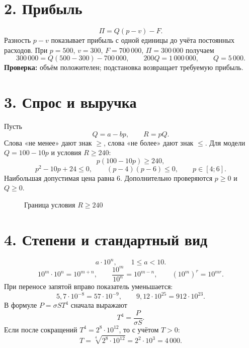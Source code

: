 \documentclass[a4paper,12pt]{article}
\newcommand{\term}[1]{\textbf{\textcolor{darkaccent}{#1}}}
\begin{document}
\section*{2. Прибыль}
\[
\Pi=Q(p-v)-F.
\]
Разность $p-v$ показывает прибыль с одной единицы до учёта постоянных расходов.
При $p=500$, $v=300$, $F=700\,000$, $\Pi=300\,000$ получаем
\[
300\,000=Q(500-300)-700\,000,
\qquad 200Q=1\,000\,000,
\qquad Q=5\,000.
\]
\term{Проверка:} объём положителен; подстановка возвращает требуемую прибыль.
\section*{3. Спрос и выручка}
Пусть
\[
Q=a-bp,\qquad R=pQ.
\]
Слова «не менее» дают знак $\ge$, слова «не более» дают знак $\le$.
Для модели $Q=100-10p$ и условия $R\ge240$:
\[
p(100-10p)\ge240,
\]
\[
p^2-10p+24\le0,
\qquad (p-4)(p-6)\le0,
\qquad p\in[4;6].
\]
Наибольшая допустимая цена равна $6$. Дополнительно проверяются $p\ge0$ и $Q\ge0$.
\begin{figure}[ht]\centering
{}
\caption{Граница условия $R\ge240$}
\end{figure}
\section*{4. Степени и стандартный вид}
\[
a\cdot10^n,\qquad 1\le a<10.
\]
\[
10^m\cdot10^n=10^{m+n},\qquad \frac{10^m}{10^n}=10^{m-n},\qquad (10^m)^r=10^{mr}.
\]
При переносе запятой вправо показатель уменьшается:
\[
5{,}7\cdot10^{-8}=57\cdot10^{-9},
\qquad 9{,}12\cdot10^{25}=912\cdot10^{23}.
\]
В формуле $P=\sigma ST^4$ сначала выражают
\[
T^4=\frac{P}{\sigma S}.
\]
Если после сокращений $T^4=2^8\cdot10^{12}$, то с учётом $T>0$:
\[
T=\sqrt[4]{2^8\cdot10^{12}}=2^2\cdot10^3=4\,000.
\]
\end{document}

